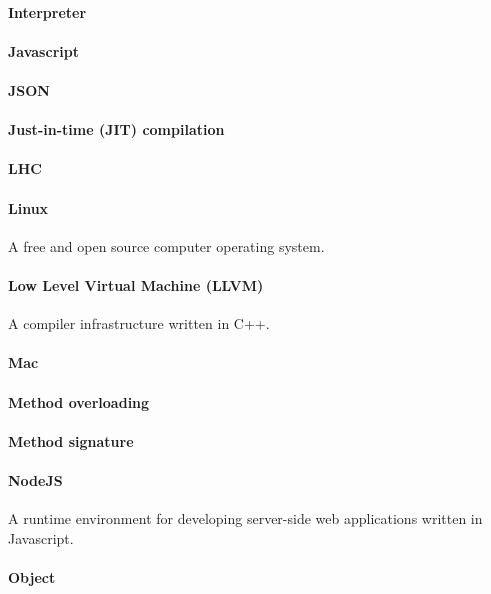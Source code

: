 \paragraph{Interpreter}
\paragraph{Javascript}
\paragraph{JSON}
\paragraph{Just-in-time (JIT) compilation}
\paragraph{LHC}
\paragraph{Linux}
A free and open source computer operating system.
\paragraph{Low Level Virtual Machine (LLVM)}
A compiler infrastructure written in C++.
\paragraph{Mac}

\paragraph{Method overloading}

\paragraph{Method signature}

\paragraph{NodeJS}
A runtime environment for developing server-side web applications written in Javascript. 

\paragraph{Object}

